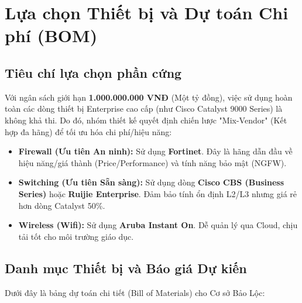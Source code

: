 \section{Lựa chọn Thiết bị và Dự toán Chi phí (BOM)}

\subsection{Tiêu chí lựa chọn phần cứng}
Với ngân sách giới hạn \textbf{1.000.000.000 VNĐ} (Một tỷ đồng), việc sử dụng hoàn toàn các dòng thiết bị Enterprise cao cấp (như Cisco Catalyst 9000 Series) là không khả thi. Do đó, nhóm thiết kế quyết định chiến lược "Mix-Vendor" (Kết hợp đa hãng) để tối ưu hóa chi phí/hiệu năng:

\begin{itemize}
    \item \textbf{Firewall (Ưu tiên An ninh):} Sử dụng \textbf{Fortinet}. Đây là hãng dẫn đầu về hiệu năng/giá thành (Price/Performance) và tính năng bảo mật (NGFW).
    \item \textbf{Switching (Ưu tiên Sẵn sàng):} Sử dụng dòng \textbf{Cisco CBS (Business Series)} hoặc \textbf{Ruijie Enterprise}. Đảm bảo tính ổn định L2/L3 nhưng giá rẻ hơn dòng Catalyst 50\%.
    \item \textbf{Wireless (Wifi):} Sử dụng \textbf{Aruba Instant On}. Dễ quản lý qua Cloud, chịu tải tốt cho môi trường giáo dục.
\end{itemize}

\subsection{Danh mục Thiết bị và Báo giá Dự kiến}
Dưới đây là bảng dự toán chi tiết (Bill of Materials) cho Cơ sở Bảo Lộc:

